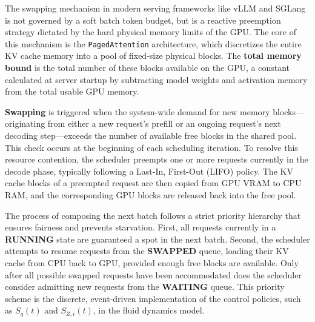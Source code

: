 The swapping mechanism in modern serving frameworks like vLLM and SGLang is not governed by a soft batch token budget, but is a reactive preemption strategy dictated by the hard physical memory limits of the GPU. The core of this mechanism is the \texttt{PagedAttention} architecture, which discretizes the entire KV cache memory into a pool of fixed-size physical blocks. The \textbf{total memory bound} is the total number of these blocks available on the GPU, a constant calculated at server startup by subtracting model weights and activation memory from the total usable GPU memory.

\textbf{Swapping} is triggered when the system-wide demand for new memory blocks—originating from either a new request's prefill or an ongoing request's next decoding step—exceeds the number of available free blocks in the shared pool. This check occurs at the beginning of each scheduling iteration. To resolve this resource contention, the scheduler preempts one or more requests currently in the decode phase, typically following a Last-In, First-Out (LIFO) policy. The KV cache blocks of a preempted request are then copied from GPU VRAM to CPU RAM, and the corresponding GPU blocks are released back into the free pool.

The process of composing the next batch follows a strict priority hierarchy that ensures fairness and prevents starvation. First, all requests currently in a \textbf{RUNNING} state are guaranteed a spot in the next batch. Second, the scheduler attempts to resume requests from the \textbf{SWAPPED} queue, loading their KV cache from CPU back to GPU, provided enough free blocks are available. Only after all possible swapped requests have been accommodated does the scheduler consider admitting new requests from the \textbf{WAITING} queue. This priority scheme is the discrete, event-driven implementation of the control policies, such as $S_q(t)$ and $S_{Z,i}(t)$, in the fluid dynamics model.